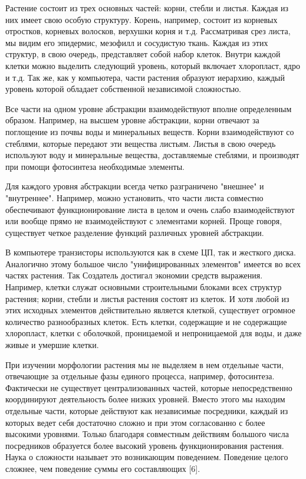 \documentclass[a4paper,12pt]{article}
\begin{document}
\begin{small}
Растение состоит из трех основных частей: корни, стебли и листья. Каждая из них имеет свою особую структуру. Корень, например, состоит из корневых отростков, корневых волосков, верхушки корня и т.д. Рассматривая срез листа, мы видим его эпидермис, мезофилл и сосудистую ткань. Каждая из этих структур, в свою очередь, представляет собой набор клеток. Внутри каждой клетки можно выделить следующий уровень, который включает хлоропласт, ядро и т.д. Так же, как у компьютера, части растения образуют иерархию, каждый уровень которой обладает собственной независимой сложностью.\par \medskip 
Все части на одном уровне абстракции взаимодействуют вполне определенным образом. Например, на высшем уровне абстракции, корни отвечают за поглощение из почвы воды и минеральных веществ. Корни взаимодействуют со стеблями, которые передают эти вещества листьям. Листья в свою очередь используют воду и минеральные вещества, доставляемые стеблями, и производят при помощи фотосинтеза необходимые элементы. \par \medskip
Для каждого уровня абстракции всегда четко разграничено "внешнее" и "внутреннее". Например, можно установить, что части листа совместно обеспечивают функционирование листа в целом и очень слабо взаимодействуют или вообще прямо не взаимодействуют с элементами корней. Проще говоря, существует четкое разделение функций различных уровней абстракции. \par \medskip
В компьютере транзисторы используются как в схеме ЦП, так и жесткого диска. Аналогично этому большое число "унифицированных элементов" имеется во всех частях растения. Так Создатель достигал экономии средств выражения. Например, клетки служат основными строительными блоками всех структур растения; корни, стебли и листья растения состоят из клеток. И хотя любой из этих исходных элементов действительно является клеткой, существует огромное количество разнообразных клеток. Есть клетки, содержащие и не содержащие хлоропласт, клетки с оболочкой, проницаемой и непроницаемой для воды, и даже живые и умершие клетки. \par \medskip
При изучении морфологии растения мы не выделяем в нем отдельные части, отвечающие за отдельные фазы единого процесса, например, фотосинтеза. Фактически не существует централизованных частей, которые непосредственно координируют деятельность более низких уровней. Вместо этого мы находим отдельные части, которые действуют как независимые посредники, каждый из которых ведет себя достаточно сложно и при этом согласованно с более высокими уровнями. Только благодаря совместным действиям большого числа посредников образуется более высокий уровень функционирования растения. Наука о сложности называет это возникающим поведением. Поведение целого сложнее, чем поведение суммы его составляющих [6]. \par \medskip

\end{small}
\end{document}
